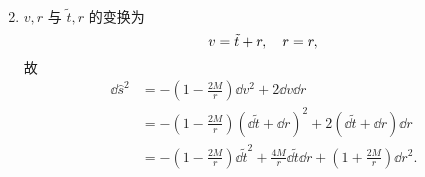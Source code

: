 \begin{xiti}
\begin{zm}
\begin{enumerate}
\begin{align*}
				\end{align*}
			\item $v, r$ 与 $\tilde{t}, r$ 的变换为
				\begin{equation*}
					v = \tilde{t} + r \qc r =r,
				\end{equation*}
				故
				\begin{align*}
					\dd \hat{s}^2 &= - \left( 1 - \frac{2M}{r} \right) \dd{v}^2 + 2 \dd{v} \dd{r}\\
					&= - \left( 1 - \frac{2M}{r} \right) \left( \dd{\tilde{t}} + \dd{r} \right)^2 + 2 \left( \dd{\tilde{t}} + \dd{r} \right) \dd{r}\\
					&= - \left( 1 - \frac{2M}{r} \right) \dd{\tilde{t}}^2 + \frac{4M}{r} \dd{\tilde{t}} \dd{r} + \left( 1 + \frac{2M}{r} \right) \dd{r}^2.
				\end{align*}
		\end{enumerate}
	\end{zm}
\end{xiti}
